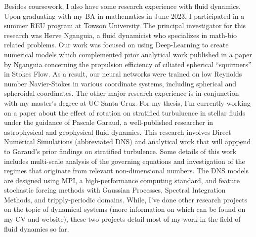 \documentclass{article}
\begin{document}
Besides coursework, I also have some research experience with fluid dynamics. Upon graduating with my BA in mathematics in June 2023, I participated in a summer REU program at Towson University. The principal investigator for this research was Herve Nganguia, a fluid dynamicist who specializes in math-bio related problems. Our work was focused on using Deep-Learning to create numerical models which complemented prior analytical work published in a paper by Nganguia concerning the propulsion efficiency of ciliated spherical ``squirmers'' in Stokes Flow. As a result, our neural networks were trained on low Reynolds number Navier-Stokes in various coordinate systems, including spherical and spheroidal coordinates. The other major research experience is in conjunction with my master's degree at UC Santa Cruz. For my thesis, I'm currently working on a paper about the effect of rotation on stratified turbuluence in stellar fluids under the guidance of Pascale Garaud, a well-published researcher in astrophysical and geophysical fluid dynamics. This research involves Direct Numerical Simulations (abbreviated DNS) and analytical work that will apppend to Garaud's prior findings on stratified turbulence. Some details of this work includes multi-scale analysis of the governing equations and investigation of the regimes that originate from relevant non-dimensional numbers. The DNS models are designed using MPI, a high-performance computing standard, and feature stochastic forcing methods with Gaussian Processes, Spectral Integration Methods, and tripply-periodic domains. While, I've done other research projects on the topic of dynamical systems (more information on which can be found on my CV and website), these two projects detail most of my work in the field of fluid dynamics so far. 

\end{document}
